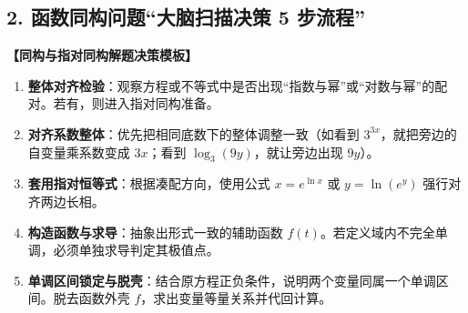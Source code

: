 \documentclass[11pt,a4paper]{ctexart}
\begin{document}
\subsection{2. 函数同构问题“大脑扫描决策 5 步流程”}

\begin{center}
\begin{tcolorbox}[colback=white, colframe=black, boxrule=0.5pt, arc=0pt, left=8pt, right=8pt, top=8pt, bottom=8pt]
\textbf{【同构与指对同构解题决策模板】}
\begin{enumerate}[label=第\arabic*步：, leftmargin=3.5em]
  \item \textbf{整体对齐检验}：观察方程或不等式中是否出现“指数与幂”或“对数与幂”的配对。若有，则进入指对同构准备。
  \item \textbf{对齐系数整体}：优先把相同底数下的整体调整一致（如看到 $3^{3x}$，就把旁边的自变量乘系数变成 $3x$；看到 $\log_3(9y)$，就让旁边出现 $9y$）。
  \item \textbf{套用指对恒等式}：根据凑配方向，使用公式 $x = e^{\ln x}$ 或 $y = \ln(e^y)$ 强行对齐两边长相。
  \item \textbf{构造函数与求导}：抽象出形式一致的辅助函数 $f(t)$。若定义域内不完全单调，必须单独求导判定其极值点。
  \item \textbf{单调区间锁定与脱壳}：结合原方程正负条件，说明两个变量同属一个单调区间。脱去函数外壳 $f$，求出变量等量关系并代回计算。
\end{enumerate}
\end{tcolorbox}
\end{center}
\end{document}
